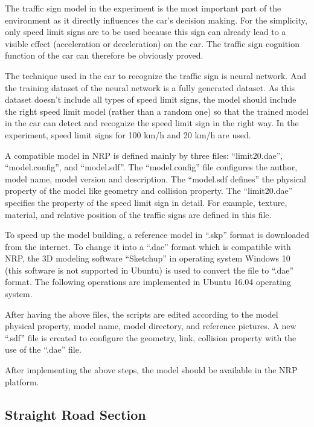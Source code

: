 The traffic sign model in the experiment is the most important part of the environment as it directly influences the car’s decision making. For the simplicity, only speed limit signs are to be used because this sign can already lead to a visible effect (acceleration or deceleration) on the car. The traffic sign cognition function of the car can therefore be obviously proved. 



The technique used in the car to recognize the traffic sign is neural network. And the training dataset of the neural network is a fully generated dataset. As this dataset doesn’t include all types of speed limit signs, the model should include the right speed limit model (rather than a random one) so that the trained model in the car can detect and recognize the speed limit sign in the right way. In the experiment, speed limit signs for 100 km/h and 20 km/h are used.



A compatible model in NRP is defined mainly by three files: ``limit20.dae'', ``model.config'', and ``model.sdf''. The ``model.config'' file configures the author, model name, model version and description. The ``model.sdf defines'' the physical property of the model like geometry and collision property. The ``limit20.dae'' specifies the property of the speed limit sign in detail. For example, texture, material, and relative position of the traffic signs are defined in this file.



To speed up the model building, a reference model in ``.skp'' format is downloaded from the internet. To change it into a ``.dae'' format which is compatible with NRP, the 3D modeling software ``Sketchup'' in operating system Windows 10 (this software is not supported in Ubuntu) is used to convert the file to ``.dae'' format. The following operations are implemented in Ubuntu 16.04 operating system. 



After having the above files, the scripts are edited according to the model physical property, model name, model directory, and reference pictures. A new ``.sdf'' file is created to configure the geometry, link, collision property with the use of the ``.dae'' file. 

After implementing the above steps, the model should be available in the NRP platform.

\subsection{Straight Road Section}

